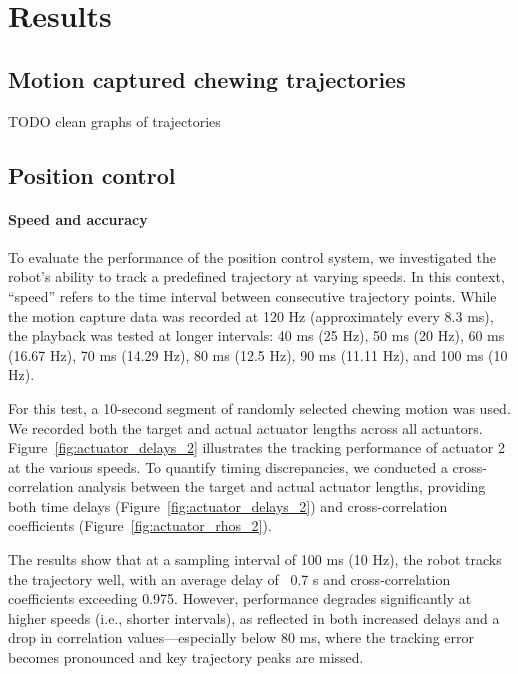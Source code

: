 \section{Results}
\subsection{Motion captured chewing trajectories}

TODO clean graphs of trajectories

\subsection{Position control}

\paragraph{Speed and accuracy}
To evaluate the performance of the position control system, we investigated the robot's ability to track a predefined trajectory at varying speeds. 
In this context, “speed” refers to the time interval between consecutive trajectory points. While the motion capture data was recorded at 120 Hz 
(approximately every 8.3 ms), the playback was tested at longer intervals: 40 ms (25 Hz), 50 ms (20 Hz), 60 ms (16.67 Hz), 70 ms (14.29 Hz), 80 ms 
(12.5 Hz), 90 ms (11.11 Hz), and 100 ms (10 Hz).

For this test, a 10-second segment of randomly selected chewing motion was used. We recorded both the target and actual actuator lengths across all 
actuators. Figure~\ref{fig:actuator_delays_2} illustrates the tracking performance of actuator 2 at the various speeds. To quantify timing discrepancies, we 
conducted a cross-correlation analysis between the target and actual actuator lengths, providing both time delays (Figure~\ref{fig:actuator_delays_2}) 
and cross-correlation coefficients (Figure~\ref{fig:actuator_rhos_2}).

The results show that at a sampling interval of 100 ms (10 Hz), the robot tracks the trajectory well, with an average delay of ~0.7 s and 
cross-correlation coefficients exceeding 0.975. However, performance degrades significantly at higher speeds (i.e., shorter intervals), 
as reflected in both increased delays and a drop in correlation values—especially below 80 ms, where the tracking error becomes pronounced 
and key trajectory peaks are missed.

